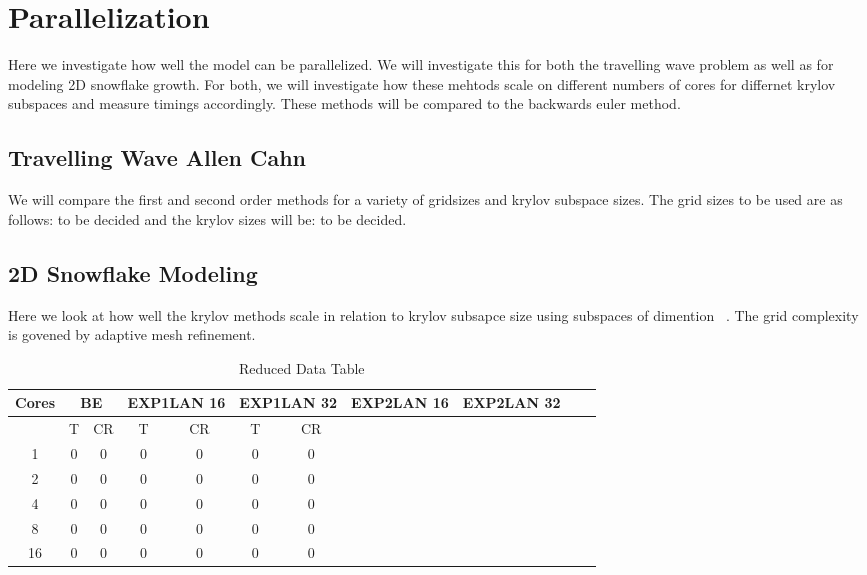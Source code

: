 \section{Parallelization}

Here we investigate how well the model can be parallelized.
We will investigate this for both the travelling wave problem as well as for modeling 2D snowflake growth.
For both, we will investigate how these mehtods scale on different numbers of cores for differnet krylov subspaces and measure timings accordingly.
These methods will be compared to the backwards euler method.

\subsection{Travelling Wave Allen Cahn}

We will compare the first and second order methods for a variety of gridsizes and krylov subspace sizes.
The grid sizes to be used are as follows: to be decided and the krylov sizes will be: to be decided.


\subsection{2D Snowflake Modeling}

Here we look at how well the krylov methods scale in relation to krylov subsapce size using subspaces of dimention ~.
The grid complexity is govened by adaptive mesh refinement.

\begin{table}[H]
    \centering
    \begin{tabular}{| c | c c | c c | c c | c c | c c | c c |}
    \hline
    Cores & \multicolumn{2}{c|}{BE} & \multicolumn{2}{c|}{EXP1LAN 16} & \multicolumn{2}{c|}{EXP1LAN 32} & \multicolumn{2}{c|}{EXP2LAN 16} & \multicolumn{2}{c|}{EXP2LAN 32} \\
    \hline
    & T & CR & T & CR & T & CR \\
    \hline
    1  & 0 & 0 & 0 & 0 & 0 & 0 \\
    2  & 0 & 0 & 0 & 0 & 0 & 0 \\
    4  & 0 & 0 & 0 & 0 & 0 & 0 \\
    8  & 0 & 0 & 0 & 0 & 0 & 0 \\
    16 & 0 & 0 & 0 & 0 & 0 & 0 \\
    \hline
    \end{tabular}
    \caption{Reduced Data Table}
    \label{tab:reduced_data}
\end{table}
